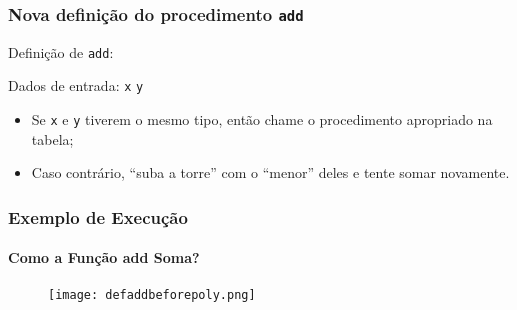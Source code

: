 \begin{frame}[fragile]
  \frametitle{Nova definição do procedimento \texttt{add}}

  Definição de \texttt{add}:

  \pause
  \vspace{2em}
  Dados de entrada: \texttt{x} \texttt{y}

  \pause
  \vspace{2em}
  \begin{itemize}
    \item Se \texttt{x} e \texttt{y} tiverem o mesmo tipo, então chame o procedimento apropriado na tabela;
    \pause
    \item Caso contrário, ``suba a torre'' com o ``menor'' deles e tente somar novamente.
  \end{itemize}

\end{frame}



\begin{frame}
  \frametitle{Exemplo de Execução}
  \framesubtitle{Como a Função add Soma?}
\end{frame}
\begin{frame}
  \begin{figure}
    \centering
    \texttt{[image: defaddbeforepoly.png]}
  \end{figure}
\end{frame}




